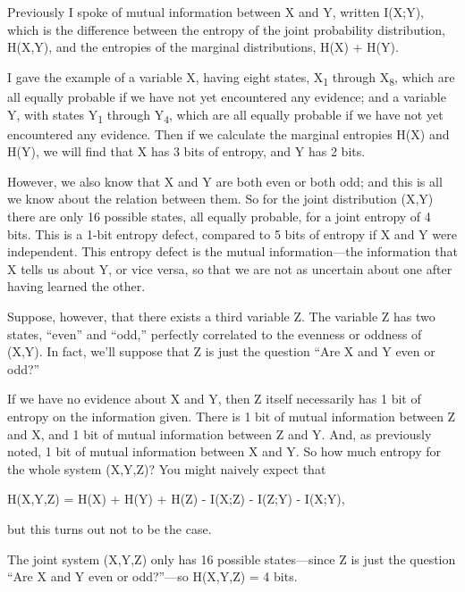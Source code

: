 
{
 Previously I spoke of mutual information between X and Y, written
I(X;Y), which is the difference between the entropy of the joint
probability distribution, H(X,Y), and the entropies of the marginal
distributions, H(X) + H(Y). }

{
 I gave the example of a variable X, having eight states,
X\textsubscript{1} through X\textsubscript{8}, which are all equally
probable if we have not yet encountered any evidence; and a variable Y,
with states Y\textsubscript{1} through Y\textsubscript{4}, which are
all equally probable if we have not yet encountered any evidence. Then
if we calculate the marginal entropies H(X) and H(Y), we will find that
X has 3 bits of entropy, and Y has 2 bits.}

{
 However, we also know that X and Y are both even or both odd; and
this is all we know about the relation between them. So for the joint
distribution (X,Y) there are only 16 possible states, all equally
probable, for a joint entropy of 4 bits. This is a 1-bit entropy
defect, compared to 5 bits of entropy if X and Y were independent. This
entropy defect is the mutual information---the information that X tells
us about Y, or vice versa, so that we are not as uncertain about one
after having learned the other.}

{
 Suppose, however, that there exists a third variable Z. The
variable Z has two states, ``even''
and ``odd,'' perfectly correlated to
the evenness or oddness of (X,Y). In fact, we'll
suppose that Z is just the question ``Are X and Y even
or odd?''}

{
 If we have no evidence about X and Y, then Z itself necessarily
has 1 bit of entropy on the information given. There is 1 bit of mutual
information between Z and X, and 1 bit of mutual information between Z
and Y. And, as previously noted, 1 bit of mutual information between X
and Y. So how much entropy for the whole system (X,Y,Z)? You might
naively expect that}

{\centering
 H(X,Y,Z) = H(X) + H(Y) + H(Z) - I(X;Z) - I(Z;Y) - I(X;Y),
\par}


\bigskip

{
 but this turns out not to be the case. }

{
 The joint system (X,Y,Z) only has 16 possible states---since Z is
just the question ``Are X and Y even or
odd?''---so H(X,Y,Z) = 4 bits.}

